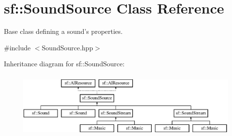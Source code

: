 \hypertarget{classsf_1_1_sound_source}{\section{sf\-:\-:Sound\-Source Class Reference}
\label{classsf_1_1_sound_source}
}


Base class defining a sound's properties.  




{\ttfamily \#include $<$Sound\-Source.\-hpp$>$}

Inheritance diagram for sf\-:\-:Sound\-Source\-:\begin{figure}[H]
\begin{center}
\leavevmode
\includegraphics[height=3.303835cm]{classsf_1_1_sound_source}
\end{center}
\end{figure}
